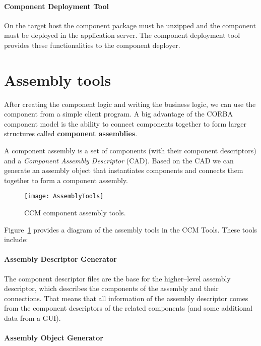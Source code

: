 \paragraph{Component Deployment Tool}

On the target host the component package must be unzipped and the component must
be deployed in the application server. The component deployment tool provides
these functionalities to the component deployer.

\section{Assembly tools}

After creating the component logic and writing the business logic, we can use
the component from a simple client program. A big advantage of the CORBA
component model is the ability to connect components together to form larger
structures called {\bf component assemblies}.

A component assembly is a set of components (with their component descriptors)
and a {\it Component Assembly Descriptor} (CAD). Based on the CAD we can
generate an assembly object that instantiates components and connects them
together to form a component assembly.

\begin{figure}
\texttt{[image: AssemblyTools]}
\caption{CCM component assembly tools.}
\label{fig:intro-AssemblyTools}
\end{figure}

Figure~\ref{fig:intro-AssemblyTools} provides a diagram of the assembly tools in
the CCM Tools. These tools include:

\paragraph{Assembly Descriptor Generator}

The component descriptor files are the base for the higher--level assembly
descriptor, which describes the components of the assembly and their
connections. That means that all information of the assembly descriptor comes
from the component descriptors of the related components (and some additional
data from a GUI).

\paragraph{Assembly Object Generator}

